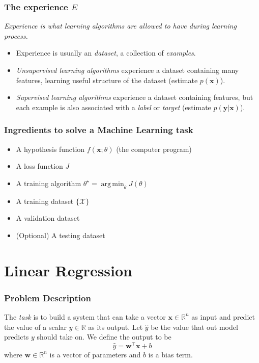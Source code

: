 \documentclass{beamer}
\DeclareMathOperator*{\argmin}{arg\,min}
\begin{document}
\begin{frame}
  \frametitle{The experience $E$}

  \emph{Experience is what learning algorithms are allowed to have during learning process.}

  \begin{itemize}
    \item[\ding{229}] Experience is usually an \emph{dataset}, a collection of \emph{examples}.
    \item[\ding{229}] \emph{Unsupervised learning algorithms} experience a dataset containing many features, learning useful structure of the dataset (estimate $p(\mathbf{x})$).
    \item[\ding{229}] \emph{Supervised learning algorithms} experience a dataset containing features, but each example is also associated with a \emph{label} or \emph{target} (estimate $p(\mathbf{y}|\mathbf{x})$).
  \end{itemize}
  
\end{frame}

\begin{frame}
    \frametitle{Ingredients to solve a Machine Learning task}
    \begin{itemize}
        \item A hypothesis function $f(\mathbf{x}; \theta)$ (the computer program)
        \item A loss function $J$
        \item A training algorithm $\theta^{\star}=\argmin_{\theta}J(\theta)$
        \item A training dataset $\{\mathcal{X}\}$
        \item A validation dataset
        \item (Optional) A testing dataset
    \end{itemize}
\end{frame}

\section{Linear Regression}

\begin{frame}
  \frametitle{Problem Description}

  The \emph{task} is to build a system that can take a vector $\mathbf{x}\in\mathbb{R}^{n}$ as input and predict the value of a scalar $y\in\mathbb{R}$ as its output. Let $\hat{y}$ be the value that out model predicts $y$ should take on. We define the output to be
  \begin{equation*}
    \hat{y}=\mathbf{w}^{\top}\mathbf{x}+b
  \end{equation*}
  where $\mathbf{w}\in\mathbb{R}^{n}$ is a vector of parameters and $b$ is a bias term.
\end{frame}
\end{document}
